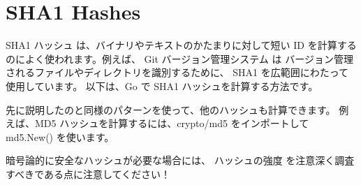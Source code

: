 \section{SHA1 Hashes}

SHA1 ハッシュ は、バイナリやテキストのかたまりに対して短い ID を計算するのによく使われます。例えば、 Git バージョン管理システム は バージョン管理されるファイルやディレクトリを識別するために、 SHA1 を広範囲にわたって使用しています。 以下は、Go で SHA1 ハッシュを計算する方法です。




先に説明したのと同様のパターンを使って、他のハッシュも計算できます。 例えば、MD5 ハッシュを計算するには、crypto/md5 をインポートして md5.New() を使います。

暗号論的に安全なハッシュが必要な場合には、 ハッシュの強度 を注意深く調査すべきである点に注意してください！